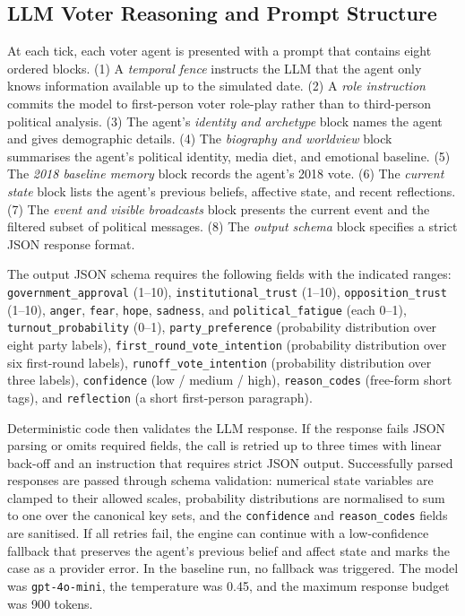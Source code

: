 \documentclass[12pt,a4paper]{report}
\begin{document}
\subsection{LLM Voter Reasoning and Prompt Structure}
\label{sec:prompt_structure}

At each tick, each voter agent is presented with a prompt that contains eight ordered blocks. (1) A \emph{temporal fence} instructs the LLM that the agent only knows information available up to the simulated date. (2) A \emph{role instruction} commits the model to first-person voter role-play rather than to third-person political analysis. (3) The agent's \emph{identity and archetype} block names the agent and gives demographic details. (4) The \emph{biography and worldview} block summarises the agent's political identity, media diet, and emotional baseline. (5) The \emph{2018 baseline memory} block records the agent's 2018 vote. (6) The \emph{current state} block lists the agent's previous beliefs, affective state, and recent reflections. (7) The \emph{event and visible broadcasts} block presents the current event and the filtered subset of political messages. (8) The \emph{output schema} block specifies a strict JSON response format.

The output JSON schema requires the following fields with the indicated ranges: \texttt{government\_approval} (1--10), \texttt{institutional\_trust} (1--10), \texttt{opposition\_trust} (1--10), \texttt{anger}, \texttt{fear}, \texttt{hope}, \texttt{sadness}, and \texttt{political\_fatigue} (each 0--1), \texttt{turnout\_probability} (0--1), \texttt{party\_preference} (probability distribution over eight party labels), \texttt{first\_round\_vote\_intention} (probability distribution over six first-round labels), \texttt{runoff\_vote\_intention} (probability distribution over three labels), \texttt{confidence} (low / medium / high), \texttt{reason\_codes} (free-form short tags), and \texttt{reflection} (a short first-person paragraph).

Deterministic code then validates the LLM response. If the response fails JSON parsing or omits required fields, the call is retried up to three times with linear back-off and an instruction that requires strict JSON output. Successfully parsed responses are passed through schema validation: numerical state variables are clamped to their allowed scales, probability distributions are normalised to sum to one over the canonical key sets, and the \texttt{confidence} and \texttt{reason\_codes} fields are sanitised. If all retries fail, the engine can continue with a low-confidence fallback that preserves the agent's previous belief and affect state and marks the case as a provider error. In the baseline run, no fallback was triggered. The model was \texttt{gpt-4o-mini}, the temperature was 0.45, and the maximum response budget was 900 tokens.
\end{document}
